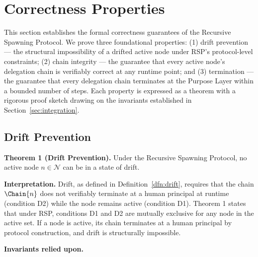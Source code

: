 \section{Correctness Properties}
\label{sec:correctness}

This section establishes the formal correctness guarantees of the Recursive Spawning Protocol. We prove three foundational properties: (1) drift prevention — the structural impossibility of a drifted active node under RSP's protocol-level constraints; (2) chain integrity — the guarantee that every active node's delegation chain is verifiably correct at any runtime point; and (3) termination — the guarantee that every delegation chain terminates at the Purpose Layer within a bounded number of steps. Each property is expressed as a theorem with a rigorous proof sketch drawing on the invariants established in Section~\ref{sec:integration}.

\subsection{Drift Prevention}
\label{sec:drift-prevention}

\textbf{Theorem 1 (Drift Prevention).} Under the Recursive Spawning Protocol, no active node $n \in \mathcal{N}$ can be in a state of drift.

\bigskip
\noindent\textbf{Interpretation.} Drift, as defined in Definition~\ref{dfn:drift}, requires that the chain $\Chain{n}$ does not verifiably terminate at a human principal at runtime (condition D2) while the node remains active (condition D1). Theorem 1 states that under RSP, conditions D1 and D2 are mutually exclusive for any node in the active set. If a node is active, its chain terminates at a human principal by protocol construction, and drift is structurally impossible.

\bigskip
\noindent\textbf{Invariants relied upon.}

